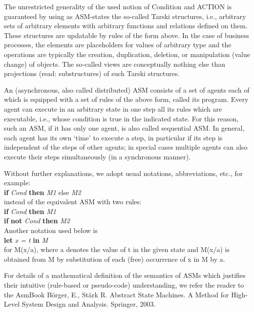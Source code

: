 The unrestricted generality of the used notion of Condition and ACTION is guaranteed by using as ASM-states the so-called Tarski structures, i.e., arbitrary sets of arbitrary elements with arbitrary functions and relations defined on them. These structures are updatable by rules of the form above. In the case of business processes, the elements are placeholders for values of arbitrary type and the operations are typically the creation, duplication, deletion, or manipulation (value change) of objects. The so-called views are conceptually nothing else than projections (read: substructures) of such Tarski structures.\

An (asynchronous, also called distributed) ASM consists of a set of agents each of which is equipped with a set of rules of the above form, called its program. Every agent can execute in an arbitrary state in one step all its rules which are executable, i.e., whose condition is true in the indicated state. For this reason, such an ASM, if it has only one agent, is also called sequential ASM. In general, each agent has its own ‘time’ to execute a step, in particular if its step is independent of the steps of other agents;  in special cases multiple agents can also execute their steps simultaneously (in a synchronous manner).\

Without further explanations, we adopt usual notations, abbreviations, etc., for example:\\
\textbf{if} \textit{Cond} \textbf{then} \textit{M1} else \textit{M2}\\
instead of the equivalent ASM with two rules:\\
\textbf{if} \textit{Cond} \textbf{then} \textit{M1} \\
\textbf{if} \textbf{not} \textit{Cond} \textbf{then} \textit{M2}\\
Another notation used below is\\
\textbf{let} \textit{x = t} \textbf{in} \textit{M}\\
for M(x/a), where a denotes the value of t in the given state and M(x/a) is obtained from M by substitution of each (free) occurrence of x in M by a.

For details of a mathematical definition of the semantics of ASMs which justifies their intuitive (rule-based or pseudo-code) understanding, we refer the reader to the AsmBook Börger, E., Stärk R. Abstract State Machines. A Method for High-Level System Design and Analysis. Springer, 2003.






